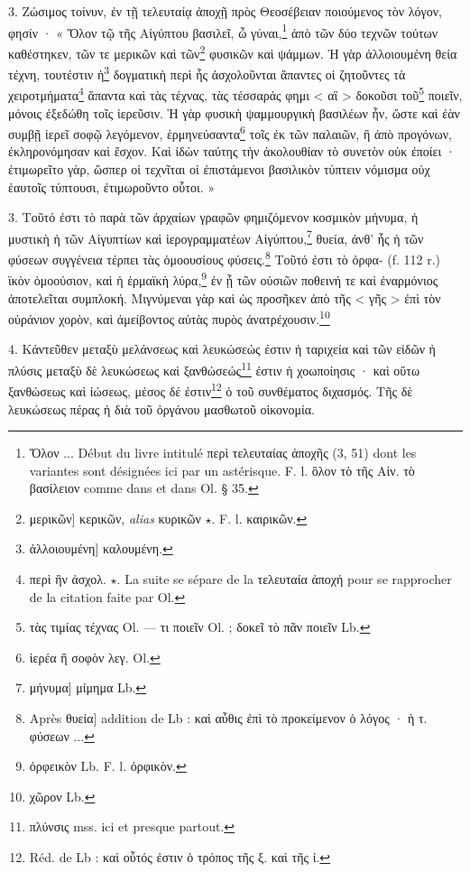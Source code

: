 \documentclass[landscape, a4paper, 11pt, oneside, polutonikogreek, french]{article}
\begin{document}
3. Ζώσιμος τοίνυν, ἐν τῇ τελευταίᾳ ἀποχῇ πρὸς Θεοσέβειαν ποιούμενος τὸν λόγον, φησίν · « Ὅλον τῷ τῆς Αἰγύπτου βασιλεῖ, ὦ γύναι,\footnote{Ὅλον ... Début du livre intitulé περὶ τελευταίας ἀποχῆς (3, 51) dont les variantes sont désignées ici par un astérisque. F. l. ὃλον τὸ τῆς Αἰν. τὸ βασίλειον comme dans et dans Ol. § 35.} ἀπὸ τῶν δύο τεχνῶν τούτων καθέστηκεν, τῶν τε μερικῶν καὶ τῶν\footnote{μερικῶν] κερικῶν, \emph{alias} κυρικῶν $\star$. F. l. καιρικῶν.} φυσικῶν καὶ ψάμμων. Ἡ γὰρ ἀλλοιουμένη θεία τέχνη, τουτέστιν ἡ\footnote{ἀλλοιουμένη] καλουμένη.} δογματικὴ περὶ ἧς ἀσχολοῦνται ἅπαντες οἱ ζητοῦντες τὰ χειροτμήματα\footnote{περὶ ἣν ἀσχολ. $\star$. La suite se sépare de la τελευταία ἀποχή pour se rapprocher de la citation faite par Ol.} ἅπαντα καὶ τὰς τέχνας, τὰς τέσσαράς φημι < αἳ > δοκοῦσι τοῦ\footnote{τὰς τιμίας τέχνας Ol. --- τι ποιεῖν Ol. ; δοκεῖ τὸ πᾶν ποιεῖν Lb.} ποιεῖν, μόνοις ἐξεδώθη τοῖς ἱερεῦσιν. Ἡ γὰρ φυσικὴ ψαμμουργικὴ βασιλέων ἦν, ὥστε καὶ ἐὰν συμβῇ ἱερεῖ σοφῷ λεγόμενον, ἑρμηνεύσαντα\footnote{ἱερέα ἢ σοφὸν λεγ. Ol.} τοῖς ἐκ τῶν παλαιῶν, ἢ ἀπὸ προγόνων, ἐκληρονόμησαν καὶ ἔσχον. Καὶ ἰδὼν ταύτης τὴν ἀκολουθίαν τὸ συνετὸν οὐκ ἐποίει · ἐτιμωρεῖτο γὰρ, ὥσπερ οἱ τεχνῖται οἱ ἐπιστάμενοι βασιλικὸν τύπτειν νόμισμα οὐχ ἑαυτοῖς τύπτουσι, ἐτιμωροῦντο οὗτοι. »

3. Τοῦτό ἐστι τὸ παρὰ τῶν ἀρχαίων γραφῶν φημιζόμενον κοσμικὸν μήνυμα, ἡ μυστικὴ ἡ τῶν Αἰγυπτίων καὶ ἱερογραμματέων Αἰγύπτου,\footnote{μήνυμα] μίμημα Lb.} θυεία, ἀνθ' ἧς ἡ τῶν φύσεων συγγένεια τέρπει τὰς ὁμοουσίους φύσεις.\footnote{Après θυεία] addition de Lb : καὶ αὖθις ἐπὶ τὸ προκείμενον ὁ λόγος · ἡ τ. φύσεων ...} Τοῦτό ἐστι τὸ ὀρφα- (f. 112 r.) ϊκὸν ὁμοούσιον, καὶ ἡ ἑρμαϊκὴ λύρα,\footnote{ὀρφεικὸν Lb. F. l. ὀρφικὸν.} ἐν ᾗ τῶν οὐσιῶν ποθεινή τε καὶ ἐναρμόνιος ἀποτελεῖται συμπλοκή. Μιγνύμεναι γὰρ καὶ ὡς προσῆκεν ἀπὸ τῆς < γῆς > ἐπὶ τὸν οὐράνιον χορὸν, καὶ ἀμείβοντος αὐτὰς πυρὸς ἀνατρέχουσιν.\footnote{χῶρον Lb.}

4. Κἀντεῦθεν μεταξὺ μελάνσεως καὶ λευκώσεώς ἐστιν ἡ ταριχεία καὶ τῶν εἰδῶν ἡ πλύσις μεταξὺ δὲ λευκώσεως καὶ ξανθώσεώς\footnote{πλύνσις mss. ici et presque partout.} ἐστιν ἡ χοωποίησις · καὶ οὕτω ξανθώσεως καὶ ἰώσεως, μέσος δέ ἐστιν\footnote{Réd. de Lb : καὶ οὗτός ἐστιν ὁ τρόπος τῆς ξ. καὶ τῆς ἰ.} ὀ τοῦ συνθέματος διχασμός. Τῆς δὲ λευκώσεως πέρας ἡ διὰ τοῦ ὀργάνου μασθωτοῦ οἰκονομία.
\end{document}
